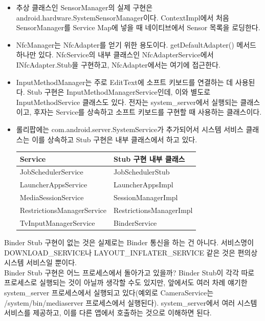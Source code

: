 \begin{itemize}
\item 추상 클래스인 SensorManager의 실제 구현은 android.hardware.SystemSensorManager이다. ContextImpl에서 처음 SensorManager를 Service Map에 넣을 때 네이티브에서 Sensor 목록을 로딩한다.

\item NfcManager는 NfcAdapter를 얻기 위한 용도이다.  getDefaultAdapter() 메서드 하나만 있다. NfcService의 내부 클래스인 NfcAdapterService에서 INfcAdapter.Stub을 구현하고, NfcAdapter에서는 여기에 접근한다.

\item InputMethodManager는 주로 EditText에 소프트 키보드를 연결하는 데 사용된다. Stub 구현은 InputMethodManagerService인데, 이와 별도로 InputMethodService 클래스도 있다. 
전자는 system\_server에서 실행되는 클래스이고, 후자는 Service를 상속하고 소프트 키보드를 구현할 때 사용하는 클래스이다.

\item 롤리팝에는 com.android.server.SystemService가 추가되어서 시스템 서비스  클래스는 이를 상속하고 Stub 구현은 내부 클래스에서 하고 있다.\\
\begin{tabular}[fontsize=\tiny]{|l|l|} \hline
Service & Stub 구현 내부 클래스 \\ \hline
JobSchedulerService & JobSchedulerStub \\ \hline
LauncherAppsService & LauncherAppsImpl \\ \hline
MediaSessionService & SessionManagerImpl \\ \hline
RestrictionsManagerService & RestrictionsManagerImpl \\ \hline
TvInputManagerService & BinderService \\ \hline
\end{tabular}
\end{itemize}

Binder Stub 구현이 없는 것은 실제로는 Binder 통신을 하는 건 아니다.
서비스명이 DOWNLOAD\_SERVICE나 LAYOUT\_INFLATER\_SERVICE 같은 것은 편의상 시스템 서비스일 뿐이다.\\

Binder Stub 구현은 어느 프로세스에서 돌아가고 있을까? Binder Stub이 각각 따로 프로세스로 실행되는 것이 아닐까 생각할 수도 있지만, 앞에서도 여러 차례 얘기한 system\_server 프로세스에서 실행되고 있다(예외로 CameraService는 /system/bin/mediaserver 프로세스에서 실행된다).			
system\_server에서 여러 시스템 서비스를 제공하고, 이를 다른 앱에서 호출하는 것으로 이해하면 된다.\\

